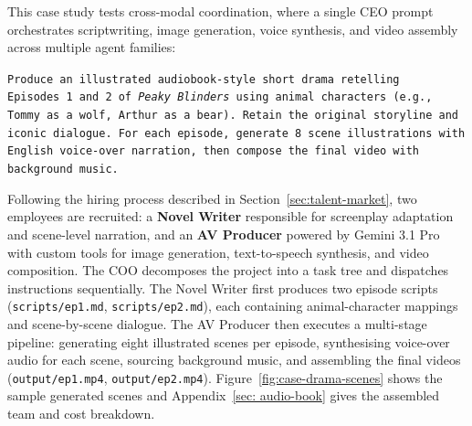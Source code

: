 \documentclass[11pt,a4paper]{article}
\begin{document}
This case study tests cross-modal coordination, where a single CEO prompt orchestrates scriptwriting, image generation, voice synthesis, and video assembly across multiple agent families:

\begin{mdframed}[
nobreak=true,
  linewidth=0.8pt,
  linecolor=black!40,
  backgroundcolor=black!2,
  innertopmargin=10pt,
  innerbottommargin=10pt,
  innerleftmargin=14pt,
  innerrightmargin=14pt,
  roundcorner=4pt
]
\sloppy
\noindent\texttt{Produce an illustrated audiobook-style short drama retelling Episodes~1 and~2 of \emph{Peaky Blinders} using animal characters (e.g., Tommy as a wolf, Arthur as a bear). Retain the original storyline and iconic dialogue. For each episode, generate 8 scene illustrations with English voice-over narration, then compose the final video with background music.}
\end{mdframed}

Following the hiring process described in Section~\ref{sec:talent-market}, two employees are recruited: a \textbf{Novel Writer} responsible for screenplay adaptation and scene-level narration, and an \textbf{AV Producer} powered by Gemini 3.1 Pro with custom tools for image generation, text-to-speech synthesis, and video composition. The COO decomposes the project into a task tree and dispatches instructions sequentially. The Novel Writer first produces two episode scripts (\texttt{scripts/ep1.md}, \texttt{scripts/ep2.md}), each containing animal-character mappings and scene-by-scene dialogue. The AV Producer then executes a multi-stage pipeline: generating eight illustrated scenes per episode, synthesising voice-over audio for each scene, sourcing background music, and assembling the final videos (\texttt{output/ep1.mp4}, \texttt{output/ep2.mp4}).  Figure~\ref{fig:case-drama-scenes} shows the sample generated scenes and Appendix~\ref{sec: audio-book} gives the assembled team and cost breakdown.
\end{document}

